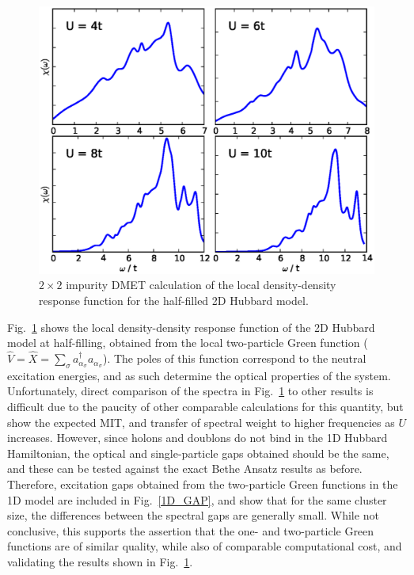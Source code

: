\documentclass[aps,twocolumn,nobibnotes]{revtex4}
\begin{document}
\begin{figure}
\begin{center}
    \vspace{-2mm}
\includegraphics[scale=0.425]{2D_DD_Spectra.eps}
\end{center}
    \vspace{-8mm}
\caption{$2 \times 2$ impurity DMET calculation of the local density-density response function for the half-filled 2D Hubbard model.}
\label{2D_DD}
\end{figure}


Fig.~\ref{2D_DD} shows the local density-density response function of the 2D Hubbard model at half-filling, obtained from the local two-particle Green 
function (${\hat V}={\hat X}=\sum_{\sigma} a_{\alpha_{\sigma}}^{\dagger}a_{\alpha_{\sigma}}$). The poles of this 
function correspond to the neutral excitation energies, and as such determine 
the optical properties of the system\cite{Millis2012,Essler91}.
Unfortunately, direct comparison of the spectra in Fig.~\ref{2D_DD} to other results is difficult due to the paucity of other comparable 
calculations for this quantity, but show the expected MIT, and transfer of spectral weight to higher frequencies as $U$ increases.
However, since holons and doublons do not bind in the 1D Hubbard Hamiltonian, 
the optical and single-particle gaps obtained should be the same, and these can be tested against the exact Bethe Ansatz results as before\cite{Essler91}. Therefore, excitation gaps
obtained from the two-particle Green functions in the 1D model are included in Fig.~\ref{1D_GAP}, and show that for the same cluster size, the differences between the spectral gaps are generally small.
While not conclusive, this supports the assertion that the one- and two-particle Green functions are of similar quality, while also of comparable computational cost, and validating the results shown in Fig.~\ref{2D_DD}.
\end{document}
